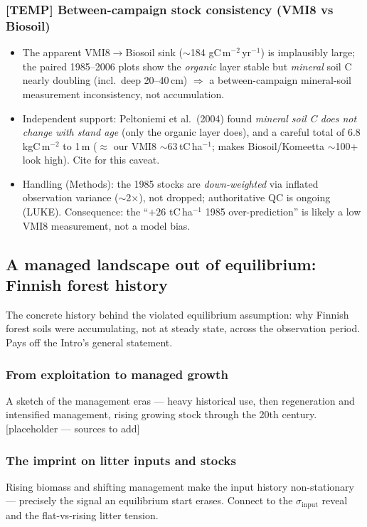 \documentclass[11pt]{article}
\begin{document}
\subsubsection{[TEMP] Between-campaign stock consistency (VMI8 vs Biosoil)}
\begin{itemize}
\item The apparent VMI8$\to$Biosoil sink ($\sim$184 gC\,m$^{-2}$\,yr$^{-1}$) is
  implausibly large; the paired 1985--2006 plots show the \emph{organic} layer
  stable but \emph{mineral} soil C nearly doubling (incl.\ deep 20--40\,cm) $\Rightarrow$
  a between-campaign mineral-soil measurement inconsistency, not accumulation.
\item Independent support: Peltoniemi et al.\ (2004) found \emph{mineral soil C does
  not change with stand age} (only the organic layer does), and a careful total of
  $6.8$\,kgC\,m$^{-2}$ to 1\,m ($\approx$ our VMI8 $\sim$63\,tC\,ha$^{-1}$; makes
  Biosoil/Komeetta $\sim$100+ look high). Cite for this caveat.
\item Handling (Methods): the 1985 stocks are \emph{down-weighted} via inflated
  observation variance ($\sim$2$\times$), not dropped; authoritative QC is ongoing
  (LUKE). Consequence: the ``$+26$ tC\,ha$^{-1}$ 1985 over-prediction'' is likely a
  low VMI8 measurement, not a model bias.
\end{itemize}

\subsection{A managed landscape out of equilibrium: Finnish forest history}
The concrete history behind the violated equilibrium assumption: why Finnish
forest soils were accumulating, not at steady state, across the observation
period. Pays off the Intro's general statement.

\subsubsection{From exploitation to managed growth}
A sketch of the management eras --- heavy historical use, then regeneration and
intensified management, rising growing stock through the 20th century.
[placeholder --- sources to add]

\subsubsection{The imprint on litter inputs and stocks}
Rising biomass and shifting management make the input history non-stationary
--- precisely the signal an equilibrium start erases. Connect to the
$\sigma_{\mathrm{input}}$ reveal and the flat-vs-rising litter tension.
\end{document}

